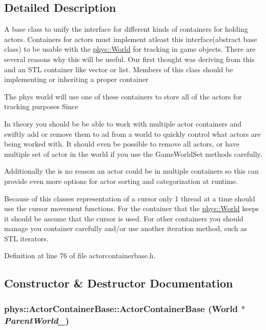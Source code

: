 \subsection{Detailed Description}
A base class to unify the interface for different kinds of containers for holding actors. Containers for actors must implement atleast this interface(abstract base class) to be usable with the \hyperlink{classphys_1_1World}{phys::World} for tracking in game objects. There are several reasons why this will be useful. Our first thought was deriving from this and an STL container like vector or list. Members of this class should be implementing or inheriting a proper container\par
\par
 The phys world will use one of these containers to store all of the actors for tracking purposes Since \par
\par
 In theory you should be be able to work with multiple actor containers and swiftly add or remove them to ad from a world to quickly control what actors are being worked with. It should even be possible to remove all actors, or have multiple set of actor in the world if you use the GameWorldSet methods carefully. \par
\par
 Additionally the is no reason an actor could be in multiple containers so this can provide even more options for actor sorting and categorization at runtime. \par
\par
 Because of this classes representation of a cursor only 1 thread at a time should use the cursor movement functions. For the container that the \hyperlink{classphys_1_1World}{phys::World} keeps it should be assume that the cursor is used. For other containers you should manage you container carefully and/or use another iteration method, such as STL iterators. 

Definition at line 76 of file actorcontainerbase.h.



\subsection{Constructor \& Destructor Documentation}
\hypertarget{classphys_1_1ActorContainerBase_a629529f9002646d463ea167af1d20df2}{
\subsubsection[{ActorContainerBase}]{\setlength{\rightskip}{0pt plus 5cm}phys::ActorContainerBase::ActorContainerBase ({\bf World} $\ast$ {\em ParentWorld\_\-})}}
\label{d1/d00/classphys_1_1ActorContainerBase_a629529f9002646d463ea167af1d20df2}


